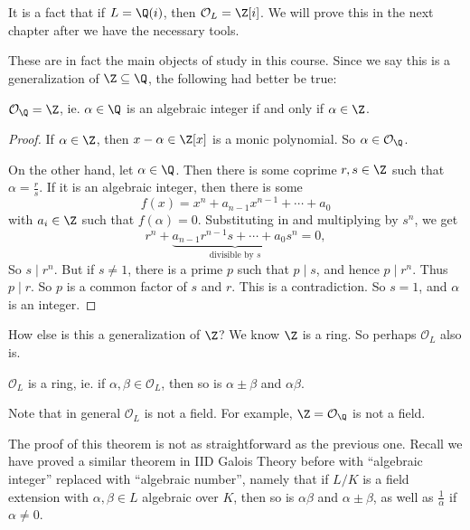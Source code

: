 \documentclass[a4paper]{article}
\begin{document}
\begin{eg}
  It is a fact that if $L = \Q(i)$, then $\mathcal{O}_L = \Z[i]$. We will prove this in the next chapter after we have the necessary tools.
\end{eg}

These are in fact the main objects of study in this course. Since we say this is a generalization of $\Z \subseteq \Q$, the following had better be true:

\begin{lemma}
  $\mathcal{O}_\Q = \Z$, ie. $\alpha \in \Q$ is an algebraic integer if and only if $\alpha \in \Z$.
\end{lemma}

\begin{proof}
  If $\alpha \in \Z$, then $x - \alpha \in \Z[x]$ is a monic polynomial. So $\alpha \in \mathcal{O}_\Q$.

  On the other hand, let $\alpha \in \Q$. Then there is some coprime $r, s \in \Z$ such that $\alpha = \frac{r}{s}$. If it is an algebraic integer, then there is some
  \[
    f(x) = x^n + a_{n - 1} x^{n - 1} + \cdots + a_0
  \]
  with $a_i \in \Z$ such that $f(\alpha) = 0$. Substituting in and multiplying by $s^n$, we get
  \[
    r^n + \underbrace{a_{n - 1} r^{n - 1}s + \cdots + a_0 s^n}_{\text{divisible by }s} = 0,
  \]
  So $s\mid r^n$. But if $s\not= 1$, there is a prime $p$ such that $p \mid s$, and hence $p \mid r^n$. Thus $p \mid r$. So $p$ is a common factor of $s$ and $r$. This is a contradiction. So $s = 1$, and $\alpha$ is an integer.
\end{proof}

How else is this a generalization of $\Z$? We know $\Z$ is a ring. So perhaps $\mathcal{O}_L$ also is.

\begin{thm}
  $\mathcal{O}_L$ is a ring, ie. if $\alpha, \beta \in \mathcal{O}_L$, then so is $\alpha \pm \beta$ and $\alpha\beta$.
\end{thm}
Note that in general $\mathcal{O}_L$ is not a field. For example, $\Z = \mathcal{O}_\Q$ is not a field.

The proof of this theorem is not as straightforward as the previous one. Recall we have proved a similar theorem in IID Galois Theory before with ``algebraic integer'' replaced with ``algebraic number'', namely that if $L/K$ is a field extension with $\alpha, \beta \in L$ algebraic over $K$, then so is $\alpha\beta$ and $\alpha \pm \beta$, as well as $\frac{1}{\alpha}$ if $\alpha \not= 0$.
\end{document}
